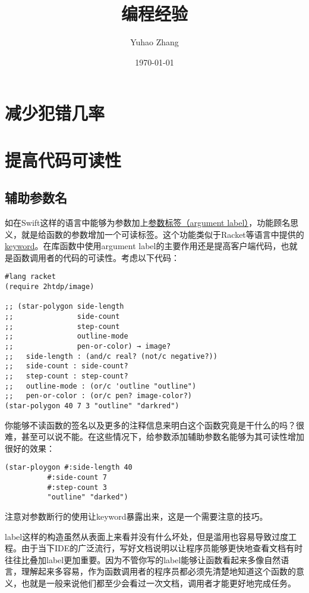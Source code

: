 \documentclass[11pt]{article}
\author{Yuhao Zhang}
\date{\today}
\title{编程经验}
\begin{document}
\maketitle
\tableofcontents


\section{减少犯错几率}
\label{sec:orgfb306ef}

\section{提高代码可读性}
\label{sec:org911d662}
\subsection{辅助参数名}
\label{sec:org7cd6922}
如在Swift这样的语言中能够为参数加上\href{https://docs.swift.org/swift-book/LanguageGuide/Functions.html\#ID166}{参数标签（argument label）}，功能顾名思义，就是给函数的参数增加一个可读标签。这个功能类似于Racket等语言中提供的\href{https://docs.racket-lang.org/guide/application.html\#\%2528part.\_keyword-args\%2529}{keyword}。在库函数中使用argument label的主要作用还是提高客户端代码，也就是函数调用者的代码的可读性。考虑以下代码：

\begin{verbatim}
#lang racket
(require 2htdp/image)

;; (star-polygon side-length	 	 	 	 
;;               side-count	 	 	 	 
;;               step-count
;;               outline-mode	 	 	 	 
;;               pen-or-color) → image?
;;   side-length : (and/c real? (not/c negative?))
;;   side-count : side-count?
;;   step-count : step-count?
;;   outline-mode : (or/c 'outline "outline")
;;   pen-or-color : (or/c pen? image-color?)
(star-polygon 40 7 3 "outline" "darkred")
\end{verbatim}

你能够不读函数的签名以及更多的注释信息来明白这个函数究竟是干什么的吗？很难，甚至可以说不能。在这些情况下，给参数添加辅助参数名能够为其可读性增加很好的效果：

\begin{verbatim}
(star-ploygon #:side-length 40
	      #:side-count 7
	      #:step-count 3
	      "outline" "darked")
\end{verbatim}

注意对参数断行的使用让keyword暴露出来，这是一个需要注意的技巧。

label这样的构造虽然从表面上来看并没有什么坏处，但是滥用也容易导致过度工程。由于当下IDE的广泛流行，写好文档说明以让程序员能够更快地查看文档有时往往比叠加label更加重要。因为不管你写的label能够让函数看起来多像自然语言，理解起来多容易，作为函数调用者的程序员都必须先清楚地知道这个函数的意义，也就是一般来说他们都至少会看过一次文档，调用者才能更好地完成任务。
\end{document}
